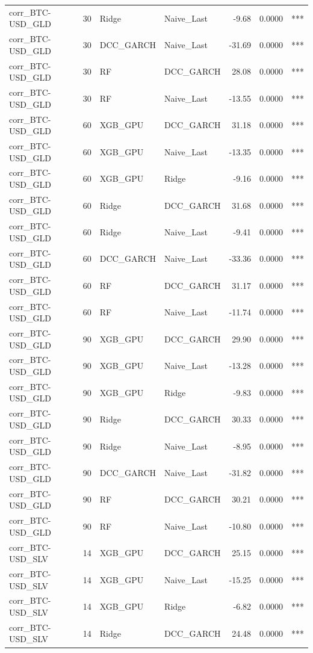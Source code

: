 \begin{table}[H]
\begin{tabular}{llllrrl}
corr_BTC-USD_GLD & 30 & Ridge & Naive_Last & -9.68 & 0.0000 & *** \\
corr_BTC-USD_GLD & 30 & DCC_GARCH & Naive_Last & -31.69 & 0.0000 & *** \\
corr_BTC-USD_GLD & 30 & RF & DCC_GARCH & 28.08 & 0.0000 & *** \\
corr_BTC-USD_GLD & 30 & RF & Naive_Last & -13.55 & 0.0000 & *** \\
corr_BTC-USD_GLD & 60 & XGB_GPU & DCC_GARCH & 31.18 & 0.0000 & *** \\
corr_BTC-USD_GLD & 60 & XGB_GPU & Naive_Last & -13.35 & 0.0000 & *** \\
corr_BTC-USD_GLD & 60 & XGB_GPU & Ridge & -9.16 & 0.0000 & *** \\
corr_BTC-USD_GLD & 60 & Ridge & DCC_GARCH & 31.68 & 0.0000 & *** \\
corr_BTC-USD_GLD & 60 & Ridge & Naive_Last & -9.41 & 0.0000 & *** \\
corr_BTC-USD_GLD & 60 & DCC_GARCH & Naive_Last & -33.36 & 0.0000 & *** \\
corr_BTC-USD_GLD & 60 & RF & DCC_GARCH & 31.17 & 0.0000 & *** \\
corr_BTC-USD_GLD & 60 & RF & Naive_Last & -11.74 & 0.0000 & *** \\
corr_BTC-USD_GLD & 90 & XGB_GPU & DCC_GARCH & 29.90 & 0.0000 & *** \\
corr_BTC-USD_GLD & 90 & XGB_GPU & Naive_Last & -13.28 & 0.0000 & *** \\
corr_BTC-USD_GLD & 90 & XGB_GPU & Ridge & -9.83 & 0.0000 & *** \\
corr_BTC-USD_GLD & 90 & Ridge & DCC_GARCH & 30.33 & 0.0000 & *** \\
corr_BTC-USD_GLD & 90 & Ridge & Naive_Last & -8.95 & 0.0000 & *** \\
corr_BTC-USD_GLD & 90 & DCC_GARCH & Naive_Last & -31.82 & 0.0000 & *** \\
corr_BTC-USD_GLD & 90 & RF & DCC_GARCH & 30.21 & 0.0000 & *** \\
corr_BTC-USD_GLD & 90 & RF & Naive_Last & -10.80 & 0.0000 & *** \\
corr_BTC-USD_SLV & 14 & XGB_GPU & DCC_GARCH & 25.15 & 0.0000 & *** \\
corr_BTC-USD_SLV & 14 & XGB_GPU & Naive_Last & -15.25 & 0.0000 & *** \\
corr_BTC-USD_SLV & 14 & XGB_GPU & Ridge & -6.82 & 0.0000 & *** \\
corr_BTC-USD_SLV & 14 & Ridge & DCC_GARCH & 24.48 & 0.0000 & *** \\

\end{tabular}
\end{table}
